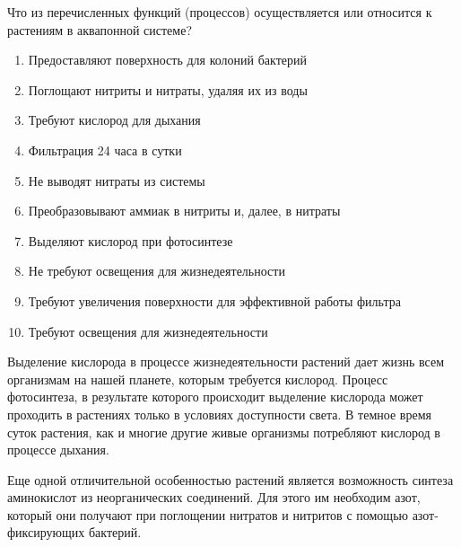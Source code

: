 
Что из перечисленных функций (процессов) осуществляется или относится к растениям в аквапонной системе?  

\begin{enumerate}
    \item Предоставляют поверхность для колоний бактерий
    \item Поглощают нитриты и нитраты, удаляя их из воды
    \item Требуют кислород для дыхания
    \item Фильтрация 24 часа в сутки
    \item Не выводят нитраты из системы
    \item Преобразовывают аммиак в нитриты и, далее, в нитраты
    \item Выделяют кислород при фотосинтезе
    \item Не требуют освещения для жизнедеятельности
    \item Требуют увеличения поверхности для эффективной работы фильтра
    \item Требуют освещения для жизнедеятельности
\end{enumerate}

\explanationSection

Выделение кислорода в процессе жизнедеятельности растений дает жизнь всем организмам на нашей планете, которым требуется кислород. Процесс фотосинтеза, в результате которого происходит выделение кислорода может проходить в растениях только в условиях доступности света. В темное время суток растения, как и многие другие живые организмы потребляют кислород в процессе дыхания. 

Еще одной отличительной особенностью растений является возможность синтеза аминокислот из неорганических соединений. Для этого им необходим азот, который они получают при поглощении нитратов и нитритов с помощью азот-фиксирующих бактерий.

